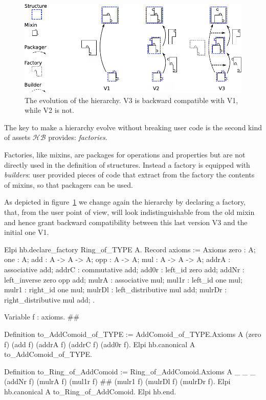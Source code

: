 \documentclass[a4paper,UKenglish,cleveref, autoref]{lipics-v2019}
\newcommand{\HB}{\ensuremath{\mathcal{HB}}}
\begin{document}
\begin{figure}[!h]
  \begin{center}
    \includegraphics[width=\textwidth]{puzzle.pdf}
  \end{center}
  \caption{\label{fig:puzzle}The evolution of the hierarchy. V3 is backward compatible with V1, while V2 is not.}
\end{figure}

The key to make a hierarchy evolve without breaking user code is the second
kind of assets \HB{} provides: \emph{factories}.

Factories, like mixins, are packages for operations and properties but are
not directly used in the definition of structures. Instead a factory is
equipped with \emph{builders}: user provided pieces of code that extract
from the factory the contents of mixins, so that packagers can be used.

As depicted in figure~\ref{fig:puzzle} we change again the hierarchy
by declaring a  factory, that, from the user point of view,
will look indistinguishable from the old  mixin
and hence grant backward compatibility between this last version V3 and the
initial one V1.

\begin{coqcode}
Elpi hb.declare_factory Ring_of_TYPE A.
  Record axioms := Axioms {
    zero : A;
    one : A;
    add : A -> A -> A;
    opp : A -> A;
    mul : A -> A -> A;
    addrA : associative add;
    addrC : commutative add;
    add0r : left_id zero add;
    addNr : left_inverse zero opp add;
    mulrA : associative mul;
    mul1r : left_id one mul;
    mulr1 : right_id one mul;
    mulrDl : left_distributive mul add;
    mulrDr : right_distributive mul add;
  }.

  Variable f : axioms.                            #\label{demo3:variable:f}#

  Definition to_AddComoid_of_TYPE :=
    AddComoid_of_TYPE.Axioms A (zero f) (add f) (addrA f) (addrC f) (add0r f).
  Elpi hb.canonical A to_AddComoid_of_TYPE.

  Definition to_Ring_of_AddComoid :=
    Ring_of_AddComoid.Axioms A _ _ _ (addNr f) (mulrA f) (mul1r f) #\label{demo3:phantom}#
      (mulr1 f) (mulrDl f) (mulrDr f).
  Elpi hb.canonical A to_Ring_of_AddComoid.
Elpi hb.end.
\end{coqcode}
\end{document}

